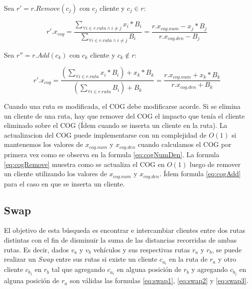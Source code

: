 \bigskip

Sea $r' = r.Remove(c_j)$ con $c_j$ cliente y $c_j \in r$:

\begin{equation} \label{eq:cogRemove}
r'.x_{cog} =  \frac{\sum_{\forall i \in r.ruta \wedge i \neq j} x_i * B_i}{\sum_{\forall i \in r.ruta \wedge i \neq j} B_i}  = \frac{r.x_{cog.num}-x_j*B_j}{r.x_{cog.den}-B_j}
\end{equation}

\bigskip

Sea $r'' = r.Add(c_k)$ con $c_k$ cliente y $c_k \notin r$:

\begin{equation} \label{eq:cogAdd}
r'.x_{cog} =  \frac{(\sum_{\forall i \in r.ruta} x_i * B_i) + x_k * B_k}{(\sum_{\forall i \in r.ruta} B_i) + B_k}  = \frac{r.x_{cog.num}+x_k*B_k}{r.x_{cog.den}+B_k}
\end{equation}

\bigskip

Cuando una ruta es modificada, el COG debe modificarse acorde. Si se elimina un cliente de una ruta, hay que remover del COG el impacto que tenía el cliente eliminado sobre el COG (Ídem cuando se inserta un cliente en la ruta). La actualizacion del COG puede implementarse con un complejidad de $O(1)$ si mantenemos los valores de $x_{cog.num}$ y $x_{cog.den}$ cuando calculamos el COG por primera vez como se observa en la formula \ref{eq:cogNumDen}. La formula \ref{eq:cogRemove} muestra como se actualiza el COG en $O(1)$ luego de remover un cliente utilizando los valores de $x_{cog.num}$ y $x_{cog.den}$. Ídem formula \ref{eq:cogAdd} para el caso en que se inserta un cliente.

\bigskip


\subsection{Swap}

El objetivo de esta búsqueda es encontrar e intercambiar clientes entre dos rutas distintas con el fin de disminuir la suma de las distancias recorridas de ambas rutas. Es decir, dados $v_a$ y $v_b$ vehículos y sus respectivas rutas $r_a$ y $r_b$, se puede realizar un \textit{Swap} entre sus rutas si existe un cliente $c_{a_i}$ en la ruta de $r_a$ y otro cliente $c_{b_j}$ en $r_b$ tal que agregando $c_{a_i}$ en alguna posición de $r_b$ y agregando $c_{b_j}$ en alguna posición de $r_a$ son válidas las formulas \ref{eq:swap1}, \ref{eq:swap2} y \ref{eq:swap3}.

